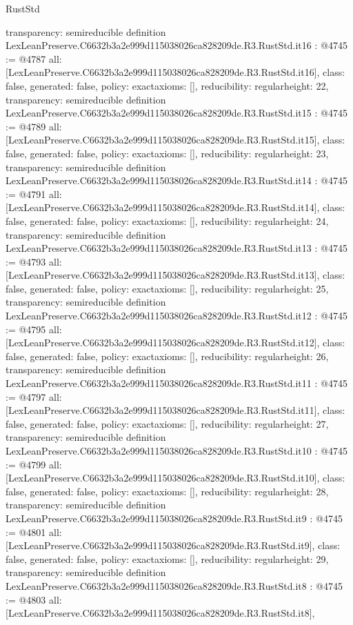 \begin{lexlean}{RustStd}
\begin{coremodule}
{  transparency: semireducible
}
definition LexLeanPreserve.C6632b3a2e999d115038026ca828209de.R3.RustStd.it16 : @4745 := @4787 {
  all: [LexLeanPreserve.C6632b3a2e999d115038026ca828209de.R3.RustStd.it16],
  class: false,
  generated: false,
  policy: exact{axioms: []},
  reducibility: regular{height: 22},
  transparency: semireducible
}
definition LexLeanPreserve.C6632b3a2e999d115038026ca828209de.R3.RustStd.it15 : @4745 := @4789 {
  all: [LexLeanPreserve.C6632b3a2e999d115038026ca828209de.R3.RustStd.it15],
  class: false,
  generated: false,
  policy: exact{axioms: []},
  reducibility: regular{height: 23},
  transparency: semireducible
}
definition LexLeanPreserve.C6632b3a2e999d115038026ca828209de.R3.RustStd.it14 : @4745 := @4791 {
  all: [LexLeanPreserve.C6632b3a2e999d115038026ca828209de.R3.RustStd.it14],
  class: false,
  generated: false,
  policy: exact{axioms: []},
  reducibility: regular{height: 24},
  transparency: semireducible
}
definition LexLeanPreserve.C6632b3a2e999d115038026ca828209de.R3.RustStd.it13 : @4745 := @4793 {
  all: [LexLeanPreserve.C6632b3a2e999d115038026ca828209de.R3.RustStd.it13],
  class: false,
  generated: false,
  policy: exact{axioms: []},
  reducibility: regular{height: 25},
  transparency: semireducible
}
definition LexLeanPreserve.C6632b3a2e999d115038026ca828209de.R3.RustStd.it12 : @4745 := @4795 {
  all: [LexLeanPreserve.C6632b3a2e999d115038026ca828209de.R3.RustStd.it12],
  class: false,
  generated: false,
  policy: exact{axioms: []},
  reducibility: regular{height: 26},
  transparency: semireducible
}
definition LexLeanPreserve.C6632b3a2e999d115038026ca828209de.R3.RustStd.it11 : @4745 := @4797 {
  all: [LexLeanPreserve.C6632b3a2e999d115038026ca828209de.R3.RustStd.it11],
  class: false,
  generated: false,
  policy: exact{axioms: []},
  reducibility: regular{height: 27},
  transparency: semireducible
}
definition LexLeanPreserve.C6632b3a2e999d115038026ca828209de.R3.RustStd.it10 : @4745 := @4799 {
  all: [LexLeanPreserve.C6632b3a2e999d115038026ca828209de.R3.RustStd.it10],
  class: false,
  generated: false,
  policy: exact{axioms: []},
  reducibility: regular{height: 28},
  transparency: semireducible
}
definition LexLeanPreserve.C6632b3a2e999d115038026ca828209de.R3.RustStd.it9 : @4745 := @4801 {
  all: [LexLeanPreserve.C6632b3a2e999d115038026ca828209de.R3.RustStd.it9],
  class: false,
  generated: false,
  policy: exact{axioms: []},
  reducibility: regular{height: 29},
  transparency: semireducible
}
definition LexLeanPreserve.C6632b3a2e999d115038026ca828209de.R3.RustStd.it8 : @4745 := @4803 {
  all: [LexLeanPreserve.C6632b3a2e999d115038026ca828209de.R3.RustStd.it8],
}
\end{coremodule}
\end{lexlean}

